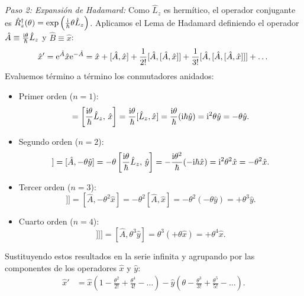 \begin{ejemplobox}
    \textit{Paso 2: Expansión de Hadamard:}
    Como $\hat{L}_z$ es hermítico, el operador conjugante es $\hat{R}_z^\dagger(\theta) = \exp\left(\frac{\mathrm{i}}{\hbar}\theta\hat{L}_z\right)$. Aplicamos el Lema de Hadamard definiendo el operador $\hat{A} \equiv \frac{\mathrm{i}\theta}{\hbar}\hat{L}_z$ y $\hat{B} \equiv \hat{x}$:
    \begin{equation}
        \hat{x}' = \mathrm{e}^{\hat{A}}\hat{x}\mathrm{e}^{-\hat{A}} = \hat{x} + [\hat{A}, \hat{x}] + \frac{1}{2!}[\hat{A}, [\hat{A}, \hat{x}]] + \frac{1}{3!}[\hat{A}, [\hat{A}, [\hat{A}, \hat{x}]]] + \dots
    \end{equation}
    Evaluemos término a término los conmutadores anidados:
    \begin{itemize}
        \item Primer orden ($n = 1$):
        \begin{equation}
            [\hat{A}, \hat{x}] = \left[\frac{\iu\theta}{\hbar}\hat{L}_z, \, \hat{x}\right] = \frac{\iu\theta}{\hbar}[\hat{L}_z, \hat{x}] = \frac{\iu\theta}{\hbar}(\iu\hbar\hat{y}) = \iu^2 \theta \hat{y} = -\theta\hat{y}.
        \end{equation}
        \item Segundo orden ($n = 2$):
        \begin{equation}
            [\hat{A}, [\hat{A}, \hat{x}]] = [\hat{A}, -\theta\hat{y}] = -\theta\left[\frac{\iu\theta}{\hbar}\hat{L}_z, \, \hat{y}\right] = -\frac{\iu\theta^2}{\hbar}(-\iu\hbar\hat{x}) = \iu^2 \theta^2 \hat{x} = -\theta^2 \hat{x}.
        \end{equation}
        \item Tercer orden ($n = 3$):
        \begin{equation}
            [\hat{A}, [\hat{A}, [\hat{A}, \hat{x}]]] = [\hat{A}, -\theta^2\hat{x}] = -\theta^2 [\hat{A}, \hat{x}] = -\theta^2(-\theta\hat{y}) = +\theta^3\hat{y}.
        \end{equation}
        \item Cuarto orden ($n = 4$):
        \begin{equation}
            [\hat{A}, [\hat{A}, [\hat{A}, [\hat{A}, \hat{x}]]]] = [\hat{A}, \theta^3\hat{y}] = \theta^3(+\theta\hat{x}) = +\theta^4\hat{x}.
        \end{equation}
    \end{itemize}
    Sustituyendo estos resultados en la serie infinita y agrupando por las componentes de los operadores $\hat{x}$ y $\hat{y}$:
    \begin{align}
        \hat{x}' &= \hat{x}\left(1 - \frac{\theta^2}{2!} + \frac{\theta^4}{4!} - \dots\right) - \hat{y}\left(\theta - \frac{\theta^3}{3!} + \frac{\theta^5}{5!} - \dots\right).

\end{align}
\end{ejemplobox}

